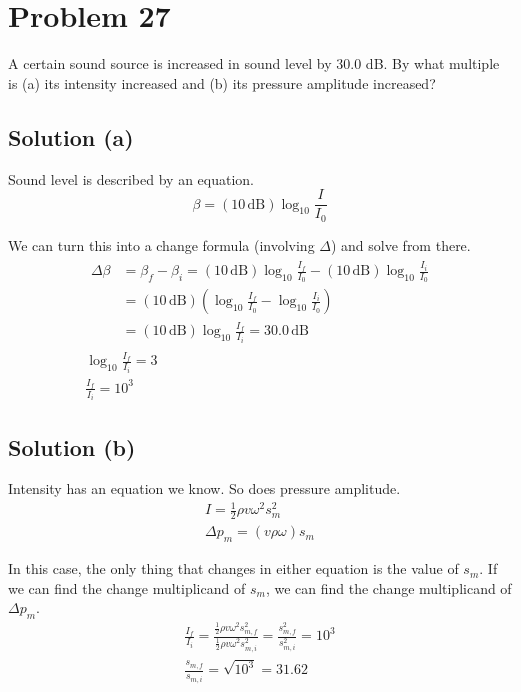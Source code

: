 \documentclass[12pt]{article}
\begin{document}
    \pagebreak
    \section{Problem 27}
        A certain sound source is increased in sound level by 30.0 dB. By what multiple is (a) its intensity increased and (b) its pressure amplitude increased?

        \subsection{Solution (a)}
            Sound level is described by an equation.
            \begin{equation}
                \beta = (10\,\unit{\deci\bel}) \log_{10} \frac{I}{I_0}
            \end{equation}

            We can turn this into a change formula (involving $\Delta$) and solve from there.
            \begin{gather}
                \begin{align}
                    \Delta \beta    &=  \beta_f - \beta_i
                        =   (10\,\unit{\deci\bel}) \log_{10} \frac{I_f}{I_0} - (10\,\unit{\deci\bel}) \log_{10} \frac{I_i}{I_0}\\
                        &=  (10\,\unit{\deci\bel}) \left( \log_{10} \frac{I_f}{I_0} - \log_{10} \frac{I_i}{I_0} \right)\\
                        &=  (10\,\unit{\deci\bel}) \log_{10} \frac{I_f}{I_i}
                        =   30.0\,\unit{\deci\bel}
                \end{align}\\
                \log_{10} \frac{I_f}{I_i} = 3\\
                \frac{I_f}{I_i} = \boxed{10^3}
            \end{gather}

        \subsection{Solution (b)}
            Intensity has an equation we know. So does pressure amplitude.
            \begin{gather}
                I   =   \frac{1}{2}\rho v \omega^2 s_m^2\\
                \Delta p_m  =   (v\rho\omega)s_m
            \end{gather}

            In this case, the only thing that changes in either equation is the value of $s_m$.
            If we can find the change multiplicand of $s_m$, we can find the change multiplicand of $\Delta p_m$.
            \begin{gather}
                \frac{I_f}{I_i} = \frac{\frac{1}{2}\rho v \omega^2 s_{m,f}^2}{\frac{1}{2}\rho v \omega^2 s_{m,i}^2}
                    =   \frac{s_{m,f}^2}{s_{m,i}^2}
                    =   10^3\\
                \frac{s_{m,f}}{s_{m,i}} =   \sqrt{10^3}
                    =   \boxed{31.62}
            \end{gather}
\end{document}
